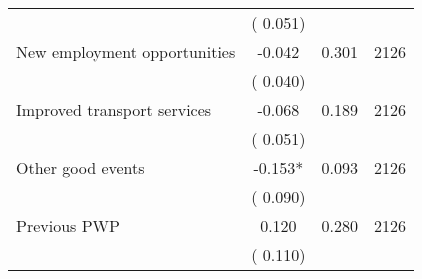 \begin{tabular}{l*{3}{c}}
                               &        (       0.051)            &                               &                               \\ 
 New employment opportunities                &             -0.042        &        0.301   & 2126              \\ 
                               &        (       0.040)            &                               &                               \\ 
 Improved transport services                &             -0.068        &        0.189   & 2126              \\ 
                               &        (       0.051)            &                               &                               \\ 
 Other good events                &             -0.153*        &        0.093   & 2126              \\ 
                               &        (       0.090)            &                               &                               \\ 
 Previous PWP                &              0.120        &        0.280   & 2126              \\ 
                               &        (       0.110)            &                               &                               \\ 
\hline \end{tabular}                                                                                              
